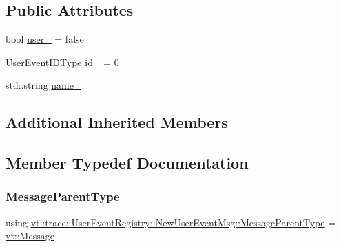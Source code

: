 \subsection*{Public Attributes}
\begin{DoxyCompactItemize}
\item 
bool \hyperlink{structvt_1_1trace_1_1_user_event_registry_1_1_new_user_event_msg_a6317d5623c1edcce684641fe0115824c}{user\+\_\+} = false
\item 
\hyperlink{namespacevt_1_1trace_a5908920d051c144c89f17c69ed262350}{User\+Event\+I\+D\+Type} \hyperlink{structvt_1_1trace_1_1_user_event_registry_1_1_new_user_event_msg_a6e1f863bc07f7edc7e869de47d725acf}{id\+\_\+} = 0
\item 
std\+::string \hyperlink{structvt_1_1trace_1_1_user_event_registry_1_1_new_user_event_msg_a6189fab0f945cd51f56aed0ebcd14ed6}{name\+\_\+}
\end{DoxyCompactItemize}
\subsection*{Additional Inherited Members}


\subsection{Member Typedef Documentation}
\mbox{\label{structvt_1_1trace_1_1_user_event_registry_1_1_new_user_event_msg_afbb15e38d855c994e71f19e77194eda7}} 
\subsubsection{\texorpdfstring{Message\+Parent\+Type}{MessageParentType}}
{\footnotesize\ttfamily using \hyperlink{structvt_1_1trace_1_1_user_event_registry_1_1_new_user_event_msg_afbb15e38d855c994e71f19e77194eda7}{vt\+::trace\+::\+User\+Event\+Registry\+::\+New\+User\+Event\+Msg\+::\+Message\+Parent\+Type} =  \hyperlink{namespacevt_a3a3ddfef40b4c90915fa43cdd5f129ea}{vt\+::\+Message}}



